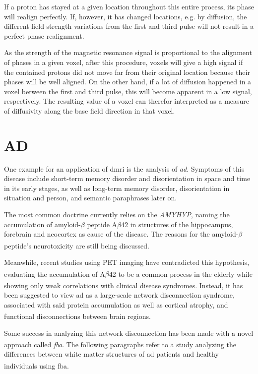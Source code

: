 \documentclass[plainreport]{cgvpub}
\newcommand{\newcite}[1]{\textsuperscript{\cite{#1}}}
\begin{document}
	If a proton has stayed at a given location throughout this entire process, its phase will realign perfectly. If, however, it has changed locations, e.g. by diffusion, the different field strength variations from the first and third pulse will not result in a perfect phase realignment. 
	
	As the strength of the magnetic resonance signal is proportional to the alignment of phases in a given voxel, after this procedure, voxels will give a high signal if the contained protons did not move far from their original location because their phases will be well aligned. On the other hand, if a lot of diffusion happened in a voxel between the first and third pulse, this will become apparent in a low signal, respectively. The resulting value of a voxel can therefor interpreted as a measure of diffusivity along the base field direction in that voxel. 
	
	\section{\Gls{AD}}
	One example for an application of \acrshort{dmri} is the analysis of \emph{\acrfull{ad}}. Symptoms of this disease include short-term memory disorder and disorientation in space and time in its early stages, as well as long-term memory disorder, disorientation in situation and person, and semantic paraphrases later on. 
	
	The most common doctrine currently relies on the \emph{\gls{AMYHYP}}, naming the accumulation of amyloid-$ \beta $ peptide A$ \beta $42 in structures of the hippocampus, forebrain and neocortex as cause of the disease. The reasons for the amyloid-$ \beta $ peptide's neurotoxicity are still being discussed\newcite{ad_haass}. 
	
	Meanwhile, recent studies using PET imaging have contradicted this hypothesis, evaluating the accumulation of A$ \beta $42 to be a common process in the elderly\newcite{mintun06}\newcite{aizenstein08} while showing only weak correlations with clinical disease syndromes\newcite{rabinovici08}\newcite{rowe10}\newcite{leyton11}\newcite{rodrigue12}. Instead, it has been suggested to view \acrshort{ad} as a large-scale network disconnection syndrome, associated with said protein accumulation as well as cortical atrophy, and functional disconnections between brain regions\newcite{canter16}. 
	
	Some success in analyzing this network disconnection has been made with a novel approach called \emph{\acrfull{fba}}\newcite{raffelt17}. The following paragraphs refer to a study analyzing the differences between white matter structures of \acrshort{ad} patients and healthy individuals\newcite{ad} using \acrshort{fba}. 
	
\end{document}
